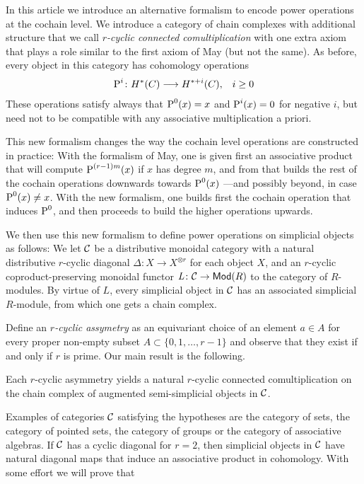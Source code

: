 In this article we introduce an alternative formalism to encode power operations at the cochain level. We introduce a category of chain complexes with additional structure that we call \emph{$r$-cyclic connected comultiplication} with one extra axiom that plays a role similar to the first axiom of May (but not the same). As before, every object in this category has cohomology operations
\begin{align*}
	\operatorname{P}^i\colon H^*(C)&\longrightarrow H^{*+i}(C), &i\geq 0
\end{align*}
These operations satisfy always that $\operatorname{P}^0(x) = x$ and $\operatorname{P}^{i}(x) = 0$ for negative $i$, but need not to be compatible with any associative multiplication a priori. %

This new formalism changes the way the cochain level operations are constructed in practice: With the formalism of May, one is given first an associative product that will compute $\operatorname{P}^{(r-1)m}(x)$ if $x$ has degree $m$, and from that builds the rest of the cochain operations downwards towards $\operatorname{P}^0(x)$ ---and possibly beyond, in case $\operatorname{P}^0(x)\neq x$. With the new formalism, one builds first the cochain operation that induces $\operatorname{P}^0$, and then proceeds to build the higher operations upwards.

We then use this new formalism to define power operations on simplicial objects as follows: We let $\mathcal{C}$ be a distributive monoidal category with a natural distributive $r$-cyclic diagonal $\Delta\colon X\to X^{\otimes r}$ for each object $X$, and an $r$-cyclic coproduct-preserving monoidal functor $\operatorname{{\it L}}\colon \mathcal{C}\to \mathsf{Mod}(R)$ to the category of $R$-modules. By virtue of $L$, every simplicial object in $\mathcal{C}$ has an associated simplicial $R$-module, from which one gets a chain complex.

Define an \emph{$r$-cyclic assymetry} as an equivariant choice of an element $a\in A$ for every proper non-empty subset $A\subset \{0,1,\ldots,r-1\}$ and observe that they exist if and only if $r$ is prime. Our main result is the following.

\begin{theorem}\label{thm:main}
	Each $r$-cyclic asymmetry yields a natural $r$-cyclic connected comultiplication on the chain complex of augmented semi-simplicial objects in $\mathcal{C}$.
\end{theorem}

Examples of categories $\mathcal{C}$ satisfying the hypotheses are the category of sets, the category of pointed sets, the category of groups or the category of associative algebras. If $\mathcal{C}$ has a cyclic diagonal for $r= 2$, then simplicial objects in $\mathcal{C}$ have natural diagonal maps that induce an associative product in cohomology. With some effort we will prove that

